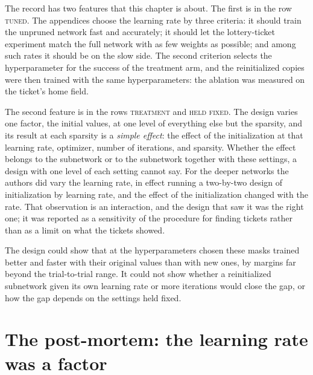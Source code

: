 \begin{refsection}
The record has two features that this chapter is about. The first is in the row \textsc{tuned}. The appendices choose the learning rate by three criteria: it should train the unpruned network fast and accurately; it should let the lottery-ticket experiment match the full network with as few weights as possible; and among such rates it should be on the slow side. The second criterion selects the hyperparameter for the success of the treatment arm, and the reinitialized copies were then trained with the same hyperparameters: the ablation was measured on the ticket's home field.

The second feature is in the rows \textsc{treatment} and \textsc{held fixed}. The design varies one factor, the initial values, at one level of everything else but the sparsity, and its result at each sparsity is a \emph{simple effect}: the effect of the initialization at that learning rate, optimizer, number of iterations, and sparsity. Whether the effect belongs to the subnetwork or to the subnetwork together with these settings, a design with one level of each setting cannot say. For the deeper networks the authors did vary the learning rate, in effect running a two-by-two design of initialization by learning rate, and the effect of the initialization changed with the rate. That observation is an interaction, and the design that saw it was the right one; it was reported as a sensitivity of the procedure for finding tickets rather than as a limit on what the tickets showed.

The design could show that at the hyperparameters chosen these masks trained better and faster with their original values than with new ones, by margins far beyond the trial-to-trial range. It could not show whether a reinitialized subnetwork given its own learning rate or more iterations would close the gap, or how the gap depends on the settings held fixed.

\section{The post-mortem: the learning rate was a factor}\label{sec:ablations:postmortem}


\end{refsection}
